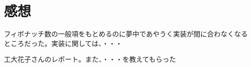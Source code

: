 \documentclass{jarticle}
\begin{document}
\section{感想}
フィボナッチ数の一般項をもとめるのに夢中であやうく実装が間に合わなくなるところだった。実装に関しては、・・・


\begin{thebibliography}{99}

 工大花子さんのレポート。また、・・・を教えてもらった 

\end{thebibliography}
\end{document}

